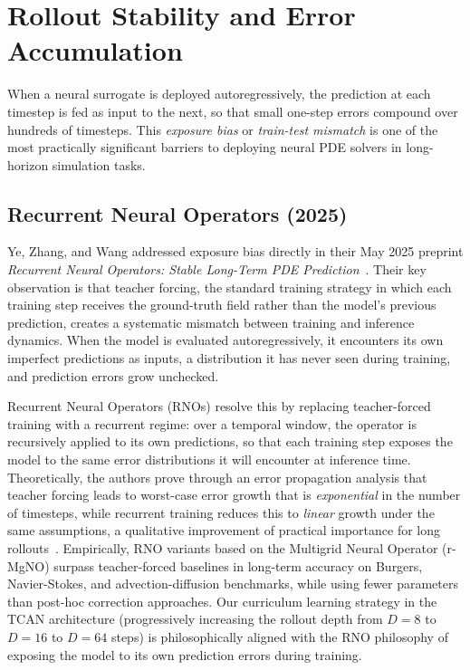 \section{Rollout Stability and Error Accumulation}
\label{sec:bg:rollout}

When a neural surrogate is deployed autoregressively, the prediction at each timestep is fed as input to the next, so that small one-step errors compound over hundreds of timesteps. This \emph{exposure bias} or \emph{train-test mismatch} is one of the most practically significant barriers to deploying neural PDE solvers in long-horizon simulation tasks.

\subsection{Recurrent Neural Operators (2025)}
\label{sec:bg:rno}

Ye, Zhang, and Wang addressed exposure bias directly in their May 2025 preprint \emph{Recurrent Neural Operators: Stable Long-Term PDE Prediction}~\cite{ye2025rno}. Their key observation is that teacher forcing, the standard training strategy in which each training step receives the ground-truth field rather than the model's previous prediction, creates a systematic mismatch between training and inference dynamics. When the model is evaluated autoregressively, it encounters its own imperfect predictions as inputs, a distribution it has never seen during training, and prediction errors grow unchecked.

Recurrent Neural Operators (RNOs) resolve this by replacing teacher-forced training with a recurrent regime: over a temporal window, the operator is recursively applied to its own predictions, so that each training step exposes the model to the same error distributions it will encounter at inference time. Theoretically, the authors prove through an error propagation analysis that teacher forcing leads to worst-case error growth that is \emph{exponential} in the number of timesteps, while recurrent training reduces this to \emph{linear} growth under the same assumptions, a qualitative improvement of practical importance for long rollouts~\cite{ye2025rno}. Empirically, RNO variants based on the Multigrid Neural Operator (r-MgNO) surpass teacher-forced baselines in long-term accuracy on Burgers, Navier-Stokes, and advection-diffusion benchmarks, while using fewer parameters than post-hoc correction approaches. Our curriculum learning strategy in the TCAN architecture (progressively increasing the rollout depth from $D=8$ to $D=16$ to $D=64$ steps) is philosophically aligned with the RNO philosophy of exposing the model to its own prediction errors during training.

